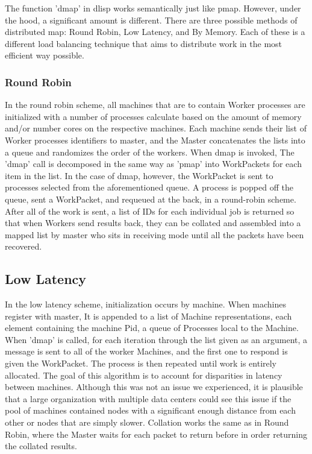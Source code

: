 \documentclass[letterpaper,twocolumn,10pt]{article}
\begin{document}
The function 'dmap' in dlisp works semantically just like pmap. However, under the hood, 
a significant amount is different. There are three possible methods of distributed map:
Round Robin, Low Latency, and By Memory. Each of these is a different load balancing technique
that aims to distribute work in the most efficient way possible.

\subsubsection{Round Robin}

In the round robin scheme, all machines that are to contain Worker processes are initialized
with a number of processes calculate based on the amount of memory and/or number cores on the
respective machines. Each machine sends their list of Worker processes identifiers to master, 
and the Master concatenates the lists into a queue and randomizes the order of the workers.
When dmap is  invoked, The 'dmap' call is decomposed in the same way as 'pmap' into WorkPackets
for each item in the list. In the case of dmap, however, the WorkPacket is sent to processes
selected from the aforementioned queue. A process is popped off the queue, sent a WorkPacket,
and requeued at the back, in a round-robin scheme. After all of the work is sent, a list of IDs
for each individual job is returned so that when Workers send results back, they can be collated
and assembled into a mapped list by master who sits in receiving mode until all the packets have
been recovered. 


\subsection{Low Latency}

In the low latency scheme, initialization occurs by machine. When machines register with master,
It is appended to a list of Machine representations, each element containing the machine Pid, 
a queue of Processes local to the Machine. When 'dmap' is called, for each iteration through the
list given as an argument, a message is sent to all of the worker Machines, and the first one to
respond is given the WorkPacket. The process is then repeated until work is entirely allocated.
The goal of this algorithm is to account for disparities in latency between machines. Although this
was not an issue we experienced, it is plausible that a large organization with multiple data centers
could see this issue if the pool of machines contained nodes with a significant enough distance from
each other or nodes that are simply slower. Collation works the same as in Round Robin, where
the Master waits for each packet to return before in order returning the collated results.
\end{document}
